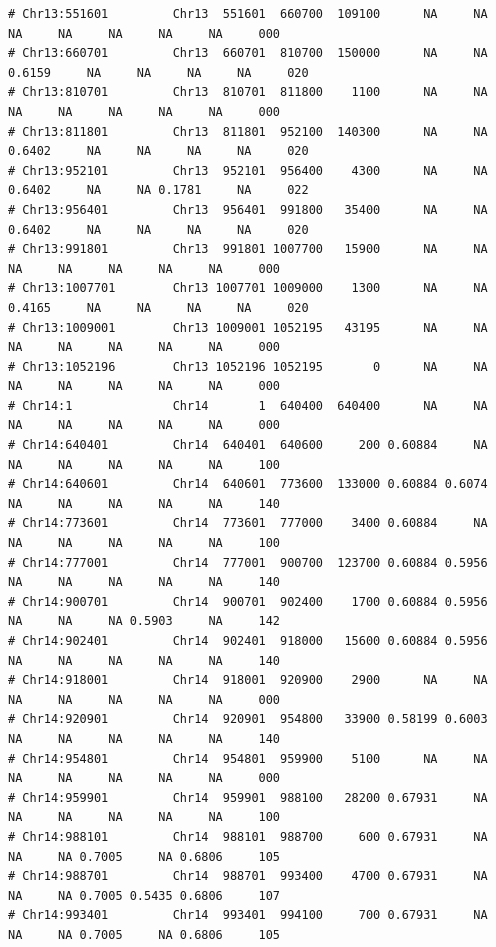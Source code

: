 \documentclass{article}\usepackage[]{graphicx}\usepackage[]{color}
\makeatletter
\newenvironment{kframe}{%
 \def\at@end@of@kframe{}%
 \ifinner\ifhmode%
  \def\at@end@of@kframe{\end{minipage}}%
  \begin{minipage}{\columnwidth}%
 \fi\fi%
 \def\FrameCommand##1{\hskip\@totalleftmargin \hskip-\fboxsep
 \colorbox{shadecolor}{##1}\hskip-\fboxsep
     \hskip-\linewidth \hskip-\@totalleftmargin \hskip\columnwidth}%
 \MakeFramed {\advance\hsize-\width
   \@totalleftmargin\z@ \linewidth\hsize
   \@setminipage}}%
 {\par\unskip\endMakeFramed%
 \at@end@of@kframe}
\newenvironment{knitrout}{}{} %
\makeatother
\begin{document}
\begin{knitrout}
\begin{kframe}
\begin{verbatim}
# Chr13:551601         Chr13  551601  660700  109100      NA     NA     NA     NA     NA     NA     NA     000
# Chr13:660701         Chr13  660701  810700  150000      NA     NA 0.6159     NA     NA     NA     NA     020
# Chr13:810701         Chr13  810701  811800    1100      NA     NA     NA     NA     NA     NA     NA     000
# Chr13:811801         Chr13  811801  952100  140300      NA     NA 0.6402     NA     NA     NA     NA     020
# Chr13:952101         Chr13  952101  956400    4300      NA     NA 0.6402     NA     NA 0.1781     NA     022
# Chr13:956401         Chr13  956401  991800   35400      NA     NA 0.6402     NA     NA     NA     NA     020
# Chr13:991801         Chr13  991801 1007700   15900      NA     NA     NA     NA     NA     NA     NA     000
# Chr13:1007701        Chr13 1007701 1009000    1300      NA     NA 0.4165     NA     NA     NA     NA     020
# Chr13:1009001        Chr13 1009001 1052195   43195      NA     NA     NA     NA     NA     NA     NA     000
# Chr13:1052196        Chr13 1052196 1052195       0      NA     NA     NA     NA     NA     NA     NA     000
# Chr14:1              Chr14       1  640400  640400      NA     NA     NA     NA     NA     NA     NA     000
# Chr14:640401         Chr14  640401  640600     200 0.60884     NA     NA     NA     NA     NA     NA     100
# Chr14:640601         Chr14  640601  773600  133000 0.60884 0.6074     NA     NA     NA     NA     NA     140
# Chr14:773601         Chr14  773601  777000    3400 0.60884     NA     NA     NA     NA     NA     NA     100
# Chr14:777001         Chr14  777001  900700  123700 0.60884 0.5956     NA     NA     NA     NA     NA     140
# Chr14:900701         Chr14  900701  902400    1700 0.60884 0.5956     NA     NA     NA 0.5903     NA     142
# Chr14:902401         Chr14  902401  918000   15600 0.60884 0.5956     NA     NA     NA     NA     NA     140
# Chr14:918001         Chr14  918001  920900    2900      NA     NA     NA     NA     NA     NA     NA     000
# Chr14:920901         Chr14  920901  954800   33900 0.58199 0.6003     NA     NA     NA     NA     NA     140
# Chr14:954801         Chr14  954801  959900    5100      NA     NA     NA     NA     NA     NA     NA     000
# Chr14:959901         Chr14  959901  988100   28200 0.67931     NA     NA     NA     NA     NA     NA     100
# Chr14:988101         Chr14  988101  988700     600 0.67931     NA     NA     NA 0.7005     NA 0.6806     105
# Chr14:988701         Chr14  988701  993400    4700 0.67931     NA     NA     NA 0.7005 0.5435 0.6806     107
# Chr14:993401         Chr14  993401  994100     700 0.67931     NA     NA     NA 0.7005     NA 0.6806     105

\end{verbatim}
\end{kframe}
\end{knitrout}
\end{document}
